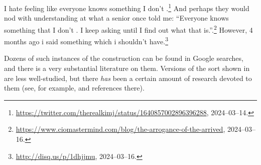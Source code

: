 \documentclass[output=paper,colorlinks,citecolor=brown]{langscibook}
\begin{document}
\begin{exe}
 \ex\label{antecDel}
  \begin{xlist}
 \ex I hate feeling like everyone knows something I don't {\gp}.\footnote{\url{https://twitter.com/therealkimj/status/1640857002896396288}, 2024--03--14.}
 \ex\label{antecDel_a}
    And perhaps they would nod with understanding at what a senior
  once told me: ``Everyone knows something that I don't {\gp}. I keep
  asking until I find out what that is.''.\footnote{\url{https://www.ciomastermind.com/blog/the-arrogance-of-the-arrived},  2024--03--16.}
 \ex However, 4 months ago i said something which i shouldn't have.\footnote{\url{http://disq.us/p/1dhjjmu}, 2024--03--16.}
  \end{xlist}
\end{exe}
Dozens of such instances of the construction can be found in Google
searches, and there is a very substantial literature on them. Versions
of the sort shown in  are less well-studied, but
there \emph{has} been a certain amount of research devoted to them (see, for example,
\citet{schuyler2002} and references there).
\end{document}
